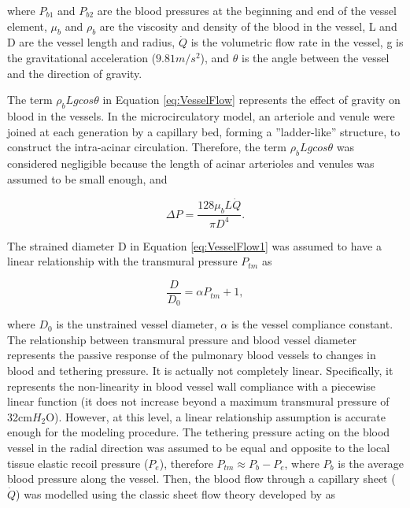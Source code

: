 \noindent where $P_{b1}$ and $P_{b2}$ are the blood pressures at the beginning and end of the vessel element, $\mu_b$ and $\rho_b$ are the viscosity and density of the blood in the vessel, L and D are the vessel length and radius, $\dot{Q}$ is the volumetric flow rate in the vessel, g is the gravitational acceleration ($9.81m/s^2$), and $\theta$ is the angle between the vessel and the direction of gravity. 

The term $\rho_b Lgcos\theta$ in Equation \ref{eq:VesselFlow} represents the effect of gravity on blood in the vessels. In the microcirculatory model, an arteriole and venule were joined at each generation by a capillary bed, forming a ''ladder-like'' structure, to construct the intra-acinar circulation. Therefore, the term $\rho_b Lgcos\theta$ was considered negligible because the length of acinar arterioles and venules was assumed to be small enough, and

\begin{equation}
 \label{eq:VesselFlow1}
 \Delta P = \frac{128 \mu_bL\dot{Q}}{\pi D^{4}}.
\end{equation}

The strained diameter D in Equation \ref{eq:VesselFlow1} was assumed to have a linear relationship with the transmural pressure $P_{tm}$ as

\begin{equation}
 \label{eq:VesselDeformation}
 \frac{D}{D_0} = \alpha P_{tm} + 1,
\end{equation}

\noindent where $D_0$ is the unstrained vessel diameter, $\alpha$ is the vessel compliance constant. The relationship between transmural pressure and blood vessel diameter represents the passive response of the pulmonary blood vessels to changes in blood and tethering pressure. It is actually not completely linear. Specifically, it represents the non-linearity in blood vessel wall compliance with a piecewise linear function (it does not increase beyond a maximum transmural pressure of 32cm$H_2$O). However, at this level, a linear relationship assumption is accurate enough for the modeling procedure. The tethering pressure acting on the blood vessel in the radial direction was assumed to be equal and opposite to the local tissue elastic recoil pressure ($P_e$), therefore $P_{tm} \approx P_b - P_e$, where $P_b$ is the average blood pressure along the vessel. Then, the blood flow through a capillary sheet ($\dot{Q}$) was modelled using the classic sheet flow theory developed by \cite{fung1969theory} as

